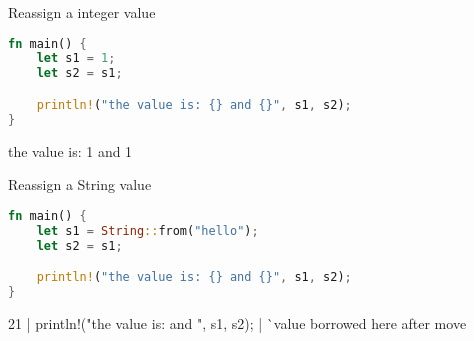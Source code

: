 
\begin{frame}[fragile,t]{Reassign a integer value}
    \begin{lstlisting}[language=Rust,escapechar=@,label={lst:borrowing1}]
fn main() {
    let s1 = 1;
    let s2 = s1;

    println!("the value is: {} and {}", s1, s2);
}\end{lstlisting}
    \pause
    \begin{codeoutput}
the value is: 1 and 1
\end{codeoutput}
\end{frame}

\begin{frame}[fragile,t]{Reassign a String value}
    \begin{lstlisting}[language=Rust,escapechar=@,label={lst:borrowing2}]
fn main() {
    let s1 = String::from("hello");
    let s2 = s1;

    println!("the value is: {} and {}", s1, s2);
}\end{lstlisting}
    \pause
    \begin{codeoutput}[red]
21 |     println!("the value is: {} and {}", s1, s2);
   |                                         ^^ value
borrowed here after move\end{codeoutput}
\end{frame}
